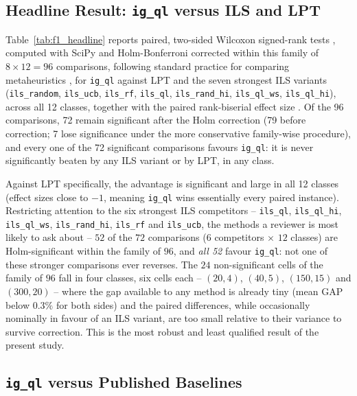 \documentclass[final,3p,times,11pt,authoryear]{elsarticle}
\begin{document}
\subsection{Headline Result: \texttt{ig\_ql} versus ILS and LPT}
\label{sec:f1-headline}

Table~\ref{tab:f1_headline} reports paired, two-sided Wilcoxon
signed-rank tests \citep{Wilcoxon1945}, computed with SciPy
\citep{VirtanenEtal2020} and Holm-Bonferroni corrected
\citep{Holm1979} within this family of $8 \times 12 = 96$ comparisons,
following standard practice for comparing metaheuristics
\citep{DerracEtal2011}, for \texttt{ig\_ql} against LPT and
the seven strongest ILS variants (\texttt{ils\_random},
\texttt{ils\_ucb}, \texttt{ils\_rf}, \texttt{ils\_ql},
\texttt{ils\_rand\_hi}, \texttt{ils\_ql\_ws}, \texttt{ils\_ql\_hi}),
across all 12 classes, together with the paired rank-biserial effect
size \citep{Kerby2014}. Of the 96 comparisons, 72 remain significant
after the Holm correction (79 before correction; 7 lose significance under the more
conservative family-wise procedure), and every one of the 72
significant comparisons favours \texttt{ig\_ql}: it is never
significantly beaten by any ILS variant or by LPT, in any class.



Against LPT specifically, the advantage is significant and large in
all 12 classes (effect sizes close to $-1$, meaning \texttt{ig\_ql}
wins essentially every paired instance). Restricting attention to the
six strongest ILS competitors -- \texttt{ils\_ql}, \texttt{ils\_ql\_hi},
\texttt{ils\_ql\_ws}, \texttt{ils\_rand\_hi}, \texttt{ils\_rf} and
\texttt{ils\_ucb}, the methods a reviewer is most likely to ask about
-- $52$ of the $72$ comparisons ($6$ competitors $\times$ $12$
classes) are Holm-significant within the family of $96$, and
\emph{all 52} favour \texttt{ig\_ql}: not one of these stronger
comparisons ever reverses. The $24$ non-significant cells of the
family of $96$ fall in four classes, six cells each -- $(20,4)$,
$(40,5)$, $(150,15)$ and $(300,20)$ -- where the gap available to any
method is already tiny (mean GAP below $0.3\%$ for both sides) and the
paired differences, while occasionally nominally in favour of an ILS
variant, are too small relative to their variance to survive
correction. This is the most robust and least qualified result of the
present study.

\subsection{\texttt{ig\_ql} versus Published Baselines}
\label{sec:f2-sota}
\end{document}
